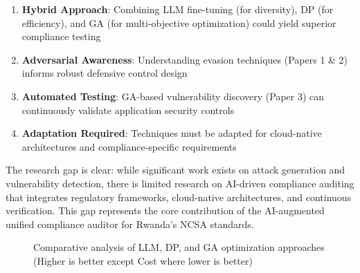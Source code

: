 \documentclass[11pt,conference]{IEEEtran}
\begin{document}
\begin{enumerate}
\begin{enumerate}
    \item \textbf{Hybrid Approach}: Combining LLM fine-tuning (for diversity), DP (for efficiency), and GA (for multi-objective optimization) could yield superior compliance testing
    \item \textbf{Adversarial Awareness}: Understanding evasion techniques (Papers 1 \& 2) informs robust defensive control design
    \item \textbf{Automated Testing}: GA-based vulnerability discovery (Paper 3) can continuously validate application security controls
    \item \textbf{Adaptation Required}: Techniques must be adapted for cloud-native architectures and compliance-specific requirements
\end{enumerate}

The research gap is clear: while significant work exists on attack generation and vulnerability detection, there is limited research on AI-driven compliance auditing that integrates regulatory frameworks, cloud-native architectures, and continuous verification. This gap represents the core contribution of the AI-augmented unified compliance auditor for Rwanda's NCSA standards.

\begin{figure}[htbp]
\centering
{}
\caption{Comparative analysis of LLM, DP, and GA optimization approaches (Higher is better except Cost where lower is better)}
\label{fig:llm_dp_ga_comparison}
\end{figure}


\end{enumerate}
\end{document}

